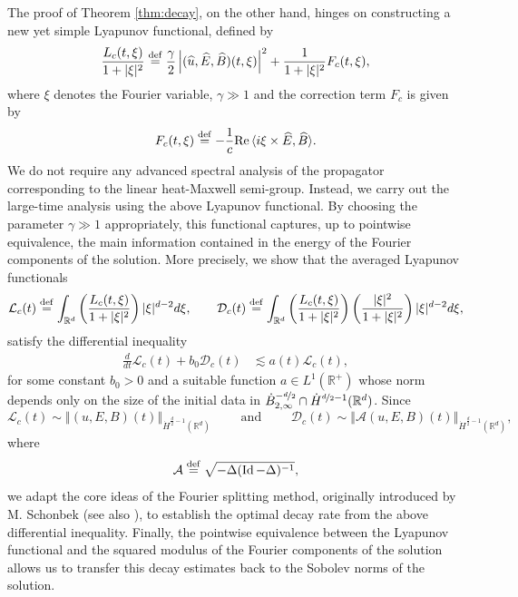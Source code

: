 \documentclass[11pt, leqno, a4paper,]{amsart}
\theoremstyle{remark}
\numberwithin{equation}{section}
\newcommand*{\bydef}{\overset{\rm def}{=}}
\newcommand*{\norm}[1]{\left\Vert #1\right\Vert}
\newcommand*{\id}{\operatorname{Id}}
\begin{document}
 The proof of Theorem \ref{thm:decay}, on the other hand, hinges on constructing a new yet simple Lyapunov functional, defined by 
 \begin{equation*}
 	\frac{L_c(t,\xi)}{ 1+ |\xi|^2 } \bydef \frac{\gamma}{2}  \left |(\widehat u, \widehat E, \widehat B)(t,\xi)\right |^2+ \frac{1}{1+|\xi|^2}F_c(t,\xi) ,
 \end{equation*} 
where $\xi$ denotes the Fourier variable, $\gamma\gg 1$ and  the correction term $F_c$ is given by
 \begin{equation*}
 	F_c(t,\xi) \bydef -\frac{1}{c} \mathrm{Re}\,\langle i\xi\times \widehat{E},\widehat{B}\rangle .
 \end{equation*}
 We do not require any advanced spectral analysis of the propagator corresponding to the linear heat-Maxwell semi-group. Instead, we carry out the large-time analysis using the above Lyapunov functional. By choosing the parameter $\gamma\gg1$ appropriately, this functional captures, up to pointwise equivalence, the main information contained in the energy of the Fourier components of the solution.
 More precisely, we show that the averaged Lyapunov functionals
 \begin{equation*}
	\mathcal{L}_c(t) \bydef \int_{\mathbb R^d} \left ( \frac{L_c(t,\xi)}{ 1+ |\xi|^2 } \right) |\xi|^{d-2}d\xi , \qquad\mathcal{D}_c (t) \bydef \int_{\mathbb R^d} \left ( \frac{L_c(t,\xi)}{ 1+ |\xi|^2 } \right) \left( \frac{|\xi|^2}{1+|\xi|^2} \right) |\xi|^{d-2}d\xi ,
\end{equation*} 
satisfy the differential inequality 
\begin{equation*}
 \begin{aligned}
 	\frac{d}{dt} \mathcal{L}_c(t) + b_0\mathcal{D}_c(t) 
 	&\lesssim   a(t)  \mathcal{L}_c(t),
 \end{aligned}
\end{equation*}
for some constant $b_0>0$ and a suitable function $a\in L^1(\mathbb R^+)$ whose norm depends only on the size of the initial data in $\dot B^{-\nicefrac{d}{2}}_{2,\infty}\cap \dot H^{\nicefrac{d}{2}-1}(\mathbb R^d)$. Since
\begin{equation*}
	\mathcal{L}_c(t) \sim \norm {(u,E,B)(t)}_{\dot H^{\frac{d}{2}-1}(\mathbb R^d)} \qquad \text{ and } \qquad 
	\mathcal{D}_c(t) \sim \norm { \mathcal A(u,E,B)(t)}_{\dot H^{\frac{d}{2}-1}(\mathbb R^d)},
\end{equation*}
where  
\begin{equation*}
	\mathcal A \bydef \sqrt{-\Delta (\id - \Delta)^{-1}},
\end{equation*}
we adapt the core ideas of the Fourier splitting method, originally introduced by M. Schonbek \cite{S86} (see also \cite{BS18}), to establish the optimal decay rate from the above differential inequality. Finally, the pointwise equivalence between the Lyapunov functional and the squared modulus of the Fourier components of the solution allows us to transfer this decay estimates back to the Sobolev norms of the solution. 
\end{document}
